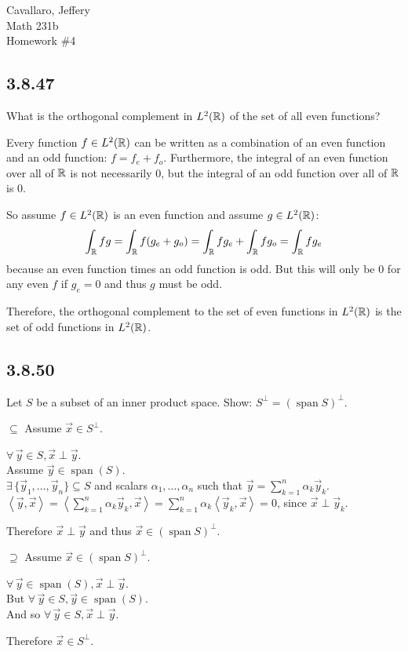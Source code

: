 \documentclass[letterpaper,12pt,fleqn]{article}
\newcommand{\vx}{\vec{x}}
\newcommand{\vy}{\vec{y}}
\newcommand{\Sp}{S^{\perp}}
\DeclareMathOperator{\spn}{span}
\newcommand{\Snp}{(\spn{S})^{\perp}}
\newcommand{\inner}[1]{\left<#1\right>}
\renewcommand{\a}{\alpha}
\begin{document}
Cavallaro, Jeffery \\
Math 231b \\
Homework \#4

\subsection*{3.8.47}

What is the orthogonal complement in $L^2(\mathbb{R})$ of the set of all even
functions?

Every function $f\in L^2(\mathbb{R})$ can be written as a combination of an even
function and an odd function: $f=f_e+f_o$. Furthermore, the integral of an even
function over all of $\mathbb{R}$ is not necessarily $0$, but the integral of an odd
function over all of $\mathbb{R}$ is $0$.

So assume $f\in L^2(\mathbb{R})$ is an even function and assume $g\in L^2(\mathbb{R})$:
\[\int_{\mathbb{R}}fg=\int_{\mathbb{R}}f(g_e+g_o)=\int_{\mathbb{R}}fg_e+\int_{\mathbb{R}}fg_o=\int_{\mathbb{R}}fg_e\]
because an even function times an odd function is odd. But this will only be
$0$ for any even $f$ if $g_e=0$ and thus $g$ must be odd.

Therefore, the orthogonal complement to the set of even functions in
$L^2(\mathbb{R})$ is the set of odd functions in $L^2(\mathbb{R})$.

\subsection*{3.8.50}

Let $S$ be a subset of an inner product space. Show: $\Sp=\Snp$.

\begin{description}
\item $\subseteq$ Assume $\vx\in\Sp$.

  $\forall\,\vy\in S,\vx\perp\vy$. \\
  Assume $\vy\in\spn(S)$. \\
  $\exists\,\{\vy_1,\ldots,\vy_n\}\subseteq S$ and scalars $\a_1,\ldots,\a_n$
  such that $\vy=\sum_{k=1}^n\a_k\vy_k$. \\
  $\inner{\vy,\vx}=\inner{\sum_{k=1}^n\a_k\vy_k,\vx}=
  \sum_{k=1}^n\a_k\inner{\vy_k,\vx}=0$, since $\vx\perp\vy_k$.

  Therefore $\vx\perp\vy$ and thus $\vx\in\Snp$.

\item $\supseteq$ Assume $\vx\in\Snp$.

  $\forall\,\vy\in\spn(S),\vx\perp\vy$. \\
  But $\forall\,\vy\in S,\vy\in\spn(S)$. \\
  And so $\forall\,\vy\in S,\vx\perp\vy$.

  Therefore $\vx\in\Sp$.
\end{description}
\end{document}
